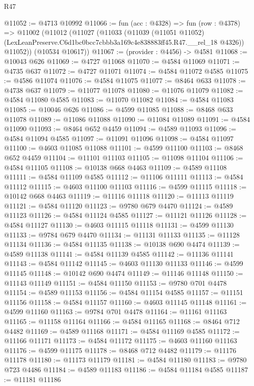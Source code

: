 \begin{lexlean}{R47}
\begin{coremodule}
@11052 := @4713 @10992
@11066 := fun (acc : @4328) =>
  fun (row : @4378) =>
  @11002
    (@11012
      (@11027
        (@11033
          (@11039
            (@11051 @11052)
            (LexLeanPreserve.C6d1bc0bcc7cbbb3a169c4e838883ff45.R47.__rel_18 @4326))
          @11052))
      (@10534 @10617))
@11067 := (provider : @4456) -> @4581
@11068 := @10043 @626
@11069 := @4727 @11068
@11070 := @4584 @11069
@11071 := @4735 @637
@11072 := @4727 @11071
@11074 := @4584 @11072 @4585
@11075 := @4586 @11074
@11076 := @4584 @11075
@11077 := @8464 @633
@11078 := @4738 @637
@11079 := @11077 @11078
@11080 := @11076 @11079
@11082 := @4584 @11080 @4585
@11083 := @11070 @11082
@11084 := @4584 @11083
@11085 := @10046 @626
@11086 := @4599 @11085
@11088 := @8468 @633 @11078
@11089 := @11086 @11088
@11090 := @11084 @11089
@11091 := @4584 @11090
@11093 := @8464 @652 @4459
@11094 := @4589 @11093
@11096 := @4584 @11094 @4585
@11097 := @11091 @11096
@11098 := @4584 @11097
@11100 := @4603 @11085 @11088
@11101 := @4599 @11100
@11103 := @8468 @652 @4459
@11104 := @11101 @11103
@11105 := @11098 @11104
@11106 := @4584 @11105
@11108 := @10138 @668 @4463
@11109 := @4589 @11108
@11111 := @4584 @11109 @4585
@11112 := @11106 @11111
@11113 := @4584 @11112
@11115 := @4603 @11100 @11103
@11116 := @4599 @11115
@11118 := @10142 @668 @4463
@11119 := @11116 @11118
@11120 := @11113 @11119
@11121 := @4584 @11120
@11123 := @9780 @679 @4470
@11124 := @4589 @11123
@11126 := @4584 @11124 @4585
@11127 := @11121 @11126
@11128 := @4584 @11127
@11130 := @4603 @11115 @11118
@11131 := @4599 @11130
@11133 := @9784 @679 @4470
@11134 := @11131 @11133
@11135 := @11128 @11134
@11136 := @4584 @11135
@11138 := @10138 @690 @4474
@11139 := @4589 @11138
@11141 := @4584 @11139 @4585
@11142 := @11136 @11141
@11143 := @4584 @11142
@11145 := @4603 @11130 @11133
@11146 := @4599 @11145
@11148 := @10142 @690 @4474
@11149 := @11146 @11148
@11150 := @11143 @11149
@11151 := @4584 @11150
@11153 := @9780 @701 @4478
@11154 := @4589 @11153
@11156 := @4584 @11154 @4585
@11157 := @11151 @11156
@11158 := @4584 @11157
@11160 := @4603 @11145 @11148
@11161 := @4599 @11160
@11163 := @9784 @701 @4478
@11164 := @11161 @11163
@11165 := @11158 @11164
@11166 := @4584 @11165
@11168 := @8464 @712 @4482
@11169 := @4589 @11168
@11171 := @4584 @11169 @4585
@11172 := @11166 @11171
@11173 := @4584 @11172
@11175 := @4603 @11160 @11163
@11176 := @4599 @11175
@11178 := @8468 @712 @4482
@11179 := @11176 @11178
@11180 := @11173 @11179
@11181 := @4584 @11180
@11183 := @9780 @723 @4486
@11184 := @4589 @11183
@11186 := @4584 @11184 @4585
@11187 := @11181 @11186

\end{coremodule}
\end{lexlean}
